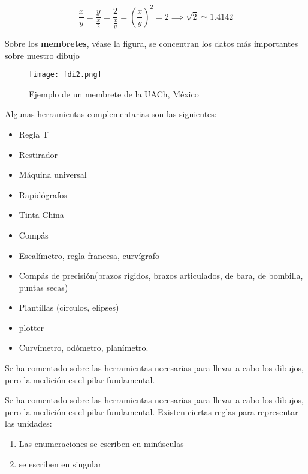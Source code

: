 \begin{equation*}
	\frac{x}{y} = \frac{y}{\frac{x}{2}} = \frac{2}{\frac{x}{y}} = \left(\frac{x}{y} \right) ^2  = 2\implies \sqrt{2}\simeq 1.4142
\end{equation*}

Sobre los \textbf{membretes}, véase la figura, se concentran los datos más importantes
sobre nuestro dibujo

\begin{figure}
	\centerline{\texttt{[image: fdi2.png]}}
	\caption{Ejemplo de un membrete de la UACh, México}
	\label{fdi2}
\end{figure}

Algunas herramientas complementarias son las siguientes:

\begin{itemize}
	\item Regla T
	\item Restirador
	\item Máquina universal
	\item Rapidógrafos
	\item Tinta China
	\item Compás
	\item Escalímetro, regla francesa, curvígrafo
	\item Compás de precisión(brazos rígidos, brazos articulados, de bara, de bombilla, puntas secas)
	\item Plantillas (círculos, elipses)
	\item plotter
	\item Curvímetro, odómetro, planímetro.
\end{itemize}

Se ha comentado sobre las herramientas necesarias para llevar a cabo los dibujos, pero la medición
es el pilar fundamental.

Se ha comentado sobre las herramientas necesarias para llevar a cabo los dibujos, pero la medición
es el pilar fundamental. Existen ciertas reglas para representar las unidades:

\begin{enumerate}
	\item Las enumeraciones se escriben en minúsculas
	\item se escriben en singular
\end{enumerate}

